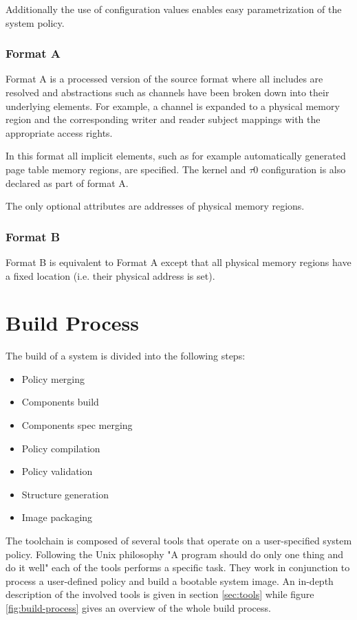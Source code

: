 \documentclass[a4paper,twoside,titlepage]{article}
\begin{document}
Additionally the use of configuration values enables easy parametrization of
the system policy.

\subsubsection{Format A}
Format A is a processed version of the source format where all includes are
resolved and abstractions such as channels have been broken down into their
underlying elements. For example, a channel is expanded to a physical memory
region and the corresponding writer and reader subject mappings with the
appropriate access rights.

In this format all implicit elements, such as for example automatically
generated page table memory regions, are specified. The kernel and $\tau$0
configuration is also declared as part of format A.

The only optional attributes are addresses of physical memory regions.

\subsubsection{Format B}
Format B is equivalent to Format A except that all physical memory regions have
a fixed location (i.e. their physical address is set).

\section{Build Process}
The build of a system is divided into the following steps:

\begin{itemize}
	\item Policy merging
	\item Components build
	\item Components spec merging
	\item Policy compilation
	\item Policy validation
	\item Structure generation
	\item Image packaging
\end{itemize}

The toolchain is composed of several tools that operate on a user-specified
system policy. Following the Unix philosophy "A program should do only one thing
and do it well" each of the tools performs a specific task. They work in
conjunction to process a user-defined policy and build a bootable system image.
An in-depth description of the involved tools is given in section
\ref{sec:tools} while figure \ref{fig:build-process} gives an overview of the
whole build process.
\end{document}
